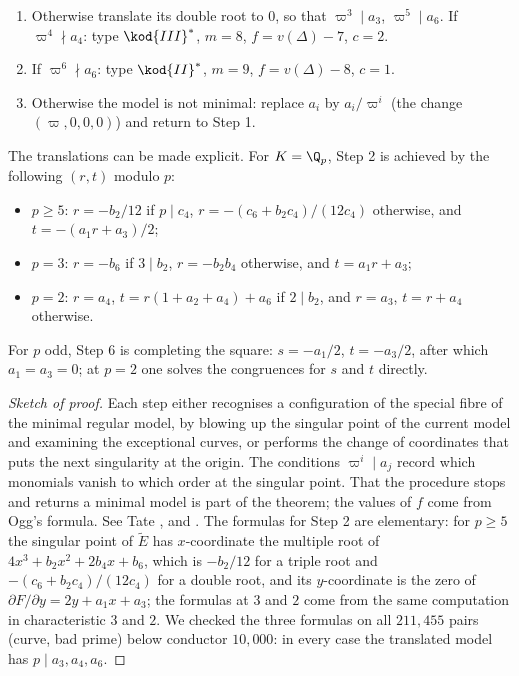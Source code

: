 \begin{theorem}
\begin{enumerate}[label=\textbf{Step \arabic*.},leftmargin=*]
$Y^2+a_{3,2}Y-a_{6,4}$ has distinct roots: type $\kod{IV}^*$, $m=7$, $f=v(\Delta)-6$, $c=3$ if the roots are in $k$,
else $c=1$.
\item Otherwise translate its double root to $0$, so that $\varpi^3\mid a_3$, $\varpi^5\mid a_6$. If $\varpi^4\nmid a_4$: type
$\kod{III}^*$, $m=8$, $f=v(\Delta)-7$, $c=2$.
\item If $\varpi^6\nmid a_6$: type $\kod{II}^*$, $m=9$, $f=v(\Delta)-8$, $c=1$.
\item Otherwise the model is not minimal: replace $a_i$ by $a_i/\varpi^i$ (the change $(\varpi,0,0,0)$) and return to
Step 1.
\end{enumerate}
The translations can be made explicit. For $K=\Q_p$, Step 2 is achieved by the following $(r,t)$ modulo $p$:
\begin{itemize}
\item $p\ge5$: $r=-b_2/12$ if $p\mid c_4$, $r=-(c_6+b_2c_4)/(12c_4)$ otherwise, and $t=-(a_1r+a_3)/2$;
\item $p=3$: $r=-b_6$ if $3\mid b_2$, $r=-b_2b_4$ otherwise, and $t=a_1r+a_3$;
\item $p=2$: $r=a_4$, $t=r(1+a_2+a_4)+a_6$ if $2\mid b_2$, and $r=a_3$, $t=r+a_4$ otherwise.
\end{itemize}
For $p$ odd, Step 6 is completing the square: $s=-a_1/2$, $t=-a_3/2$, after which $a_1=a_3=0$; at $p=2$ one solves the
congruences for $s$ and $t$ directly.
\end{theorem}

\begin{proof}[Sketch of proof]
Each step either recognises a configuration of the special fibre of the minimal regular model, by blowing up the
singular point of the current model and examining the exceptional curves, or performs the change of coordinates
that puts the next singularity at the origin. The conditions $\varpi^i\mid a_j$ record which monomials vanish to which
order at the singular point. That the procedure stops and returns a minimal model is part of the theorem; the values
of $f$ come from Ogg's formula. See Tate \cite{Tate75}, \cite[IV.9]{SilvermanATAEC} and
\cite[Section 3.2]{Cremona97}. The formulas for Step 2 are elementary: for $p\ge5$ the singular point of
$\tilde E$ has $x$-coordinate the multiple root of $4x^3+b_2x^2+2b_4x+b_6$, which is $-b_2/12$ for a triple root and
$-(c_6+b_2c_4)/(12c_4)$ for a double root, and its $y$-coordinate is the zero of $\partial F/\partial y=2y+a_1x+a_3$; the
formulas at $3$ and $2$ come from the same computation in characteristic $3$ and $2$. We checked the three
formulas on all $211{,}455$ pairs (curve, bad prime) below conductor $10{,}000$: in every case the translated model has
$p\mid a_3,a_4,a_6$.
\end{proof}

